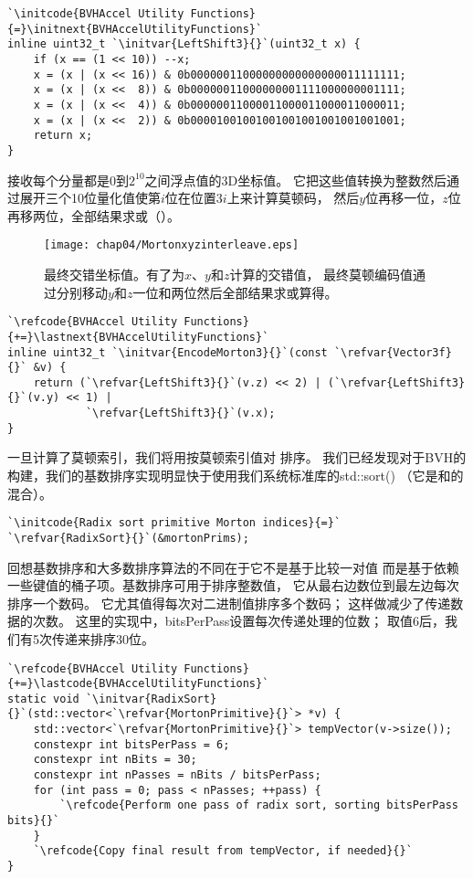 \begin{lstlisting}
`\initcode{BVHAccel Utility Functions}{=}\initnext{BVHAccelUtilityFunctions}`
inline uint32_t `\initvar{LeftShift3}{}`(uint32_t x) {
    if (x == (1 << 10)) --x;
    x = (x | (x << 16)) & 0b00000011000000000000000011111111;
    x = (x | (x <<  8)) & 0b00000011000000001111000000001111;
    x = (x | (x <<  4)) & 0b00000011000011000011000011000011;
    x = (x | (x <<  2)) & 0b00001001001001001001001001001001;
    return x;
}
\end{lstlisting}

接收每个分量都是$0$到$2^{10}$之间浮点值的3D坐标值。
它把这些值转换为整数然后通过展开三个10位量化值使第$i$位在位置$3i$上来计算莫顿码，
然后$y$位再移一位，$z$位再移两位，全部结果求或（）。
\begin{figure}[htbp]
    \centering\texttt{[image: chap04/Mortonxyzinterleave.eps]}
    \caption{最终交错坐标值。有了为$x$、$y$和$z$计算的交错值，
        最终莫顿编码值通过分别移动$y$和$z$一位和两位然后全部结果求或算得。}
    \label{fig:4.11}
\end{figure}

\begin{lstlisting}
`\refcode{BVHAccel Utility Functions}{+=}\lastnext{BVHAccelUtilityFunctions}`
inline uint32_t `\initvar{EncodeMorton3}{}`(const `\refvar{Vector3f}{}` &v) {
    return (`\refvar{LeftShift3}{}`(v.z) << 2) | (`\refvar{LeftShift3}{}`(v.y) << 1) |
            `\refvar{LeftShift3}{}`(v.x);
}
\end{lstlisting}

一旦计算了莫顿索引，我们将用按莫顿索引值对
排序。
我们已经发现对于BVH的构建，我们的基数排序实现明显快于使用我们系统标准库的{\ttfamily std::sort()}
（它是和的混合）。
\begin{lstlisting}
`\initcode{Radix sort primitive Morton indices}{=}`
`\refvar{RadixSort}{}`(&mortonPrims);
\end{lstlisting}

回想基数排序和大多数排序算法的不同在于它不是基于比较一对值
而是基于依赖一些键值的桶子项。基数排序可用于排序整数值，
它从最右边数位到最左边每次排序一个数码。
它尤其值得每次对二进制值排序多个数码；
这样做减少了传递数据的次数。
这里的实现中，{\ttfamily bitsPerPass}设置每次传递处理的位数；
取值6后，我们有5次传递来排序30位。
\begin{lstlisting}
`\refcode{BVHAccel Utility Functions}{+=}\lastcode{BVHAccelUtilityFunctions}`
static void `\initvar{RadixSort}{}`(std::vector<`\refvar{MortonPrimitive}{}`> *v) {
    std::vector<`\refvar{MortonPrimitive}{}`> tempVector(v->size());
    constexpr int bitsPerPass = 6;
    constexpr int nBits = 30;
    constexpr int nPasses = nBits / bitsPerPass;
    for (int pass = 0; pass < nPasses; ++pass) {
        `\refcode{Perform one pass of radix sort, sorting bitsPerPass bits}{}`
    }
    `\refcode{Copy final result from tempVector, if needed}{}`
}
\end{lstlisting}

